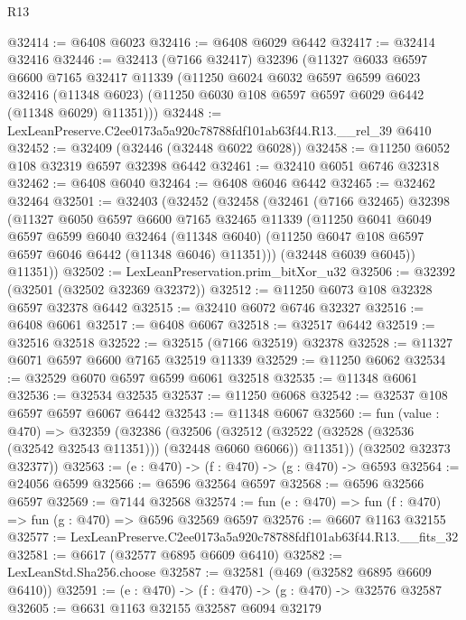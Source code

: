\begin{lexlean}{R13}
\begin{coremodule}
@32414 := @6408 @6023
@32416 := @6408 @6029 @6442
@32417 := @32414 @32416
@32446 := @32413
    (@7166 @32417)
    @32396
    (@11327
      @6033
      @6597
      @6600
      @7165
      @32417
      @11339
      (@11250
        @6024
        @6032
        @6597
        @6599
        @6023
        @32416
        (@11348 @6023)
        (@11250 @6030 @108 @6597 @6597 @6029 @6442 (@11348 @6029) @11351)))
@32448 := LexLeanPreserve.C2ee0173a5a920c78788fdf101ab63f44.R13.__rel_39 @6410
@32452 := @32409 (@32446 (@32448 @6022 @6028))
@32458 := @11250 @6052 @108 @32319 @6597 @32398 @6442
@32461 := @32410 @6051 @6746 @32318
@32462 := @6408 @6040
@32464 := @6408 @6046 @6442
@32465 := @32462 @32464
@32501 := @32403
    (@32452
      (@32458
        (@32461
          (@7166 @32465)
          @32398
          (@11327
            @6050
            @6597
            @6600
            @7165
            @32465
            @11339
            (@11250
              @6041
              @6049
              @6597
              @6599
              @6040
              @32464
              (@11348 @6040)
              (@11250 @6047 @108 @6597 @6597 @6046 @6442 (@11348 @6046) @11351)))
          (@32448 @6039 @6045))
        @11351))
@32502 := LexLeanPreservation.prim_bitXor_u32
@32506 := @32392 (@32501 (@32502 @32369 @32372))
@32512 := @11250 @6073 @108 @32328 @6597 @32378 @6442
@32515 := @32410 @6072 @6746 @32327
@32516 := @6408 @6061
@32517 := @6408 @6067
@32518 := @32517 @6442
@32519 := @32516 @32518
@32522 := @32515 (@7166 @32519) @32378
@32528 := @11327 @6071 @6597 @6600 @7165 @32519 @11339
@32529 := @11250 @6062
@32534 := @32529 @6070 @6597 @6599 @6061 @32518
@32535 := @11348 @6061
@32536 := @32534 @32535
@32537 := @11250 @6068
@32542 := @32537 @108 @6597 @6597 @6067 @6442
@32543 := @11348 @6067
@32560 := fun (value : @470) =>
  @32359
    (@32386
      (@32506
        (@32512 (@32522 (@32528 (@32536 (@32542 @32543 @11351))) (@32448 @6060 @6066)) @11351))
      (@32502 @32373 @32377))
@32563 := (e : @470) -> (f : @470) -> (g : @470) -> @6593
@32564 := @24056 @6599
@32566 := @6596 @32564 @6597
@32568 := @6596 @32566 @6597
@32569 := @7144 @32568
@32574 := fun (e : @470) => fun (f : @470) => fun (g : @470) => @6596 @32569 @6597
@32576 := @6607 @1163 @32155
@32577 := LexLeanPreserve.C2ee0173a5a920c78788fdf101ab63f44.R13.__fits_32
@32581 := @6617 (@32577 @6895 @6609 @6410)
@32582 := LexLeanStd.Sha256.choose
@32587 := @32581 (@469 (@32582 @6895 @6609 @6410))
@32591 := (e : @470) -> (f : @470) -> (g : @470) -> @32576 @32587
@32605 := @6631
    @1163
    @32155
    @32587
    @6094
    @32179

\end{coremodule}
\end{lexlean}
